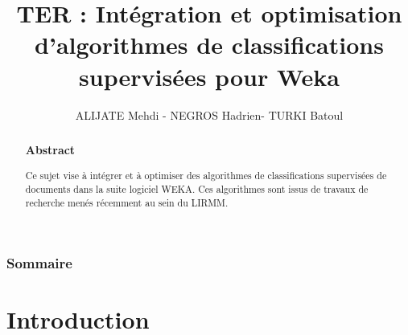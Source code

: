 \documentclass[12pt]{beamer}
\author{ALIJATE Mehdi -  NEGROS Hadrien- TURKI Batoul}
\title{TER :  Intégration et optimisation d’algorithmes de classifications supervisées pour Weka
}
\institute{Université Montpellier 2 - LIRMM}
\begin{document}
\begin{frame}
\titlepage 
\end{frame}



\begin{frame}
\begin{abstract}

\frametitle{Abstract}
\begin{center}
Ce sujet vise à intégrer et à optimiser des algorithmes de classifications supervisées de documents dans la suite logiciel WEKA. Ces algorithmes sont issus de travaux de recherche menés récemment au sein du LIRMM.
\end{center}
\end{abstract}
\end{frame}

\begin{frame}
\tableofcontents
\frametitle{Sommaire}


\end{frame}


\section{Introduction}
\end{document}
